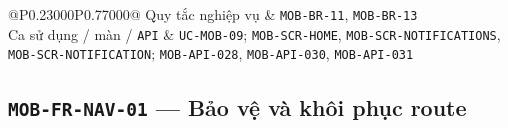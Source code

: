 \begin{longtable}{@{}P{0.23000\SRSWidth}P{0.77000\SRSWidth}@{}}
Quy tắc nghiệp vụ & \texttt{MOB-\allowbreak{}BR-\allowbreak{}11}, \texttt{MOB-\allowbreak{}BR-\allowbreak{}13} \\[3pt]
Ca sử dụng /\allowbreak{} màn /\allowbreak{} \texttt{API} & \texttt{UC-\allowbreak{}MOB-\allowbreak{}09}; \texttt{MOB-\allowbreak{}SCR-\allowbreak{}HOME}, \texttt{MOB-\allowbreak{}SCR-\allowbreak{}NOTIFICA\allowbreak{}TIONS}, \texttt{MOB-\allowbreak{}SCR-\allowbreak{}NOTIFICA\allowbreak{}TION}; \texttt{MOB-\allowbreak{}API-\allowbreak{}028}, \texttt{MOB-\allowbreak{}API-\allowbreak{}030}, \texttt{MOB-\allowbreak{}API-\allowbreak{}031} \\[3pt]
\end{longtable}
\endgroup

\subsection{\texttt{MOB-\allowbreak{}FR-\allowbreak{}NAV-\allowbreak{}01} — Bảo vệ và khôi phục route}
\begingroup
\fontsize{9.5}{12}\selectfont
\setlength{\SRSWidth}{\dimexpr\linewidth-2\tabcolsep\relax}
